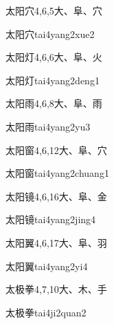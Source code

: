 \begin{entry}{太阳穴}{4,6,5}{⼤、⾩、⽳}
  \begin{phonetics}{太阳穴}{tai4yang2xue2}
  \end{phonetics}
\end{entry}

\begin{entry}{太阳灯}{4,6,6}{⼤、⾩、⽕}
  \begin{phonetics}{太阳灯}{tai4yang2deng1}
  \end{phonetics}
\end{entry}

\begin{entry}{太阳雨}{4,6,8}{⼤、⾩、⾬}
  \begin{phonetics}{太阳雨}{tai4yang2yu3}
  \end{phonetics}
\end{entry}

\begin{entry}{太阳窗}{4,6,12}{⼤、⾩、⽳}
  \begin{phonetics}{太阳窗}{tai4yang2chuang1}
  \end{phonetics}
\end{entry}

\begin{entry}{太阳镜}{4,6,16}{⼤、⾩、⾦}
  \begin{phonetics}{太阳镜}{tai4yang2jing4}
  \end{phonetics}
\end{entry}

\begin{entry}{太阳翼}{4,6,17}{⼤、⾩、⽻}
  \begin{phonetics}{太阳翼}{tai4yang2yi4}
  \end{phonetics}
\end{entry}

\begin{entry}{太极拳}{4,7,10}{⼤、⽊、⼿}
  \begin{phonetics}{太极拳}{tai4ji2quan2}
  \end{phonetics}
\end{entry}


